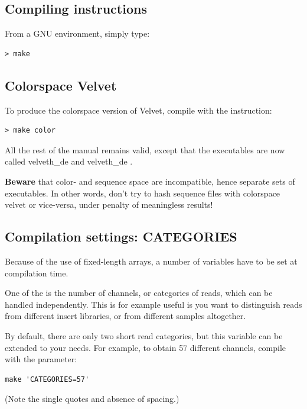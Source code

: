 \documentclass{article}
\begin{document}
\subsection{Compiling instructions}

\label{sec:compilation}

From a GNU environment, simply type:

\begin{verbatim}
> make
\end{verbatim}

\subsection{Colorspace Velvet}

To produce the colorspace version of Velvet, compile with the instruction:

\begin{verbatim}
> make color
\end{verbatim}

All the rest of the manual remains valid, except that the executables are now called velveth\_de and velveth\_de . 

\textbf{Beware} that color- and sequence space are incompatible, hence separate sets of executables. In other words, don't try to hash sequence files with colorspace velvet or vice-versa, under penalty of meaningless results!

\subsection{Compilation settings: CATEGORIES}

Because of the use of fixed-length arrays, a number of variables have to be set at compilation time. 

One of the is the number of channels, or categories of reads, which can be handled independently. This is for example useful is you want to distinguish reads from different insert libraries, or from different samples altogether.

By default, there are only two short read categories, but this variable can be extended to your needs. For example, to obtain 57 different channels, compile with the parameter:

\begin{verbatim}
make 'CATEGORIES=57'
\end{verbatim}

(Note the single quotes and absence of spacing.)
\end{document}
